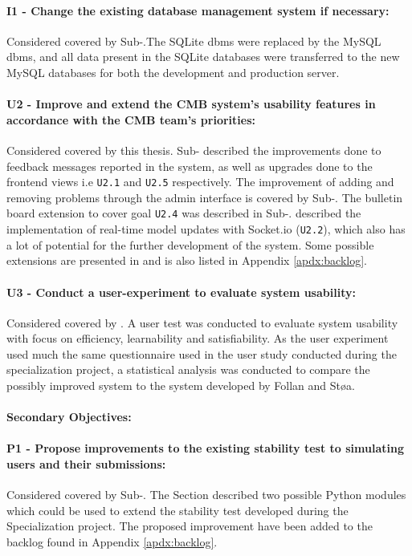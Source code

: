 \paragraph*{I1 - Change the existing database management system if necessary:} Considered covered by Sub-.The SQLite \gls{dbms} were replaced by the MySQL \gls{dbms}, and all data present in the SQLite databases were transferred to the new MySQL databases for both the development and production server.

\paragraph*{U2 - Improve and extend the CMB system’s usability features in accordance with the CMB team’s priorities:} Considered covered by this thesis. Sub- described the improvements done to feedback messages reported in the system, as well as upgrades done to the frontend views i.e \texttt{U2.1} and \texttt{U2.5} respectively. The improvement of adding and removing problems through the admin interface is covered by Sub-. The bulletin board extension to cover goal \texttt{U2.4} was described in Sub-.  described the implementation of real-time model updates with Socket.io (\texttt{U2.2}), which also has a lot of potential for the further development of the system. Some possible extensions are presented in  and is also listed in Appendix \ref{apdx:backlog}.

\paragraph*{U3 - Conduct a user-experiment to evaluate system usability:} Considered covered by . A user test was conducted to evaluate system usability with focus on efficiency, learnability and satisfiability. As the user experiment used much the same questionnaire used in the user study conducted during the specialization project, a statistical analysis was conducted to compare the possibly improved system to the system developed by Follan and Støa.

\paragraph*{Secondary Objectives:} \hfill

\paragraph*{P1 - Propose improvements to the existing stability test to simulating users and their submissions:} Considered covered by Sub-. The Section described two possible Python modules which could be used to extend the stability test developed during the Specialization project. The proposed improvement have been added to the backlog found in Appendix \ref{apdx:backlog}.

